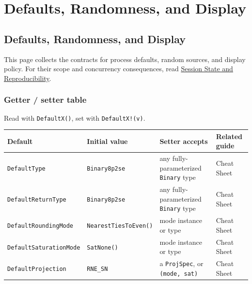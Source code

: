 \chapter{Defaults, Randomness, and Display}


\section{Defaults, Randomness, and Display}



\label{17110666169689211290}{}


This page collects the contracts for process defaults, random sources, and display policy. For their scope and concurrency consequences, read \href{concept\_\allowbreak{}session\_\allowbreak{}state.md}{Session State and Reproducibility}.



\subsection{Getter / setter table}



\label{17510285445625325441}{}


Read with \texttt{DefaultX()}, set with \texttt{DefaultX!(v)}.




\begin{table}[h]
\centering
\begin{tabulary}{\linewidth}{L L L L}
\toprule
Default & Initial value & Setter accepts & Related guide \\
\toprule
\texttt{DefaultType} & \texttt{Binary8p2se} & any fully-parameterized \texttt{Binary} type & Cheat Sheet \\
\texttt{DefaultReturnType} & \texttt{Binary8p2se} & any fully-parameterized \texttt{Binary} type & Cheat Sheet \\
\texttt{DefaultRoundingMode} & \texttt{NearestTiesToEven()} & mode instance or type & Cheat Sheet \\
\texttt{DefaultSaturationMode} & \texttt{SatNone()} & mode instance or type & Cheat Sheet \\
\texttt{DefaultProjection} & \texttt{RNE\_\allowbreak{}SN} & a \texttt{ProjSpec}, or \texttt{(mode, sat)} & Cheat Sheet \\
\bottomrule
\end{tabulary}

\end{table}





